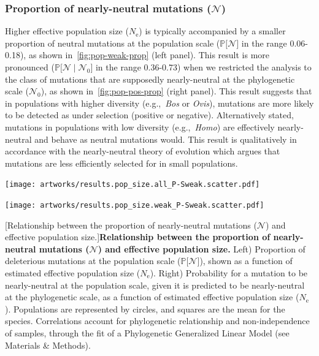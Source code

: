 \documentclass{article}
\newcommand{\Ne}{N_{\text{e}}}
\newcommand{\proba}{\mathbb{P}}
\newcommand{\SphyNeu}{\mathcal{N}_0}
\newcommand{\given}{\mid}
\newcommand{\SpopNeu}{\mathcal{N}}
\begin{document}
    \subsubsection{Proportion of nearly-neutral mutations (\texorpdfstring{$\SpopNeu$}{N})}\label{subsec:proportion-nearly-neutral-mutations}
    Higher effective population size ($\Ne$) is typically accompanied by a smaller proportion of neutral mutations at the population scale ($\proba{[} \SpopNeu {]}$ in the range 0.06-0.18), as shown in~\ref{fig:pop-weak-prop} (left panel).
    This result is more pronounced ($\proba{[} \SpopNeu \given \SphyNeu {]}$ in the range 0.36-0.73) when we restricted the analysis to the class of mutations that are supposedly nearly-neutral at the phylogenetic scale ($\SphyNeu$), as shown in~\ref{fig:pop-pos-prop} (right panel).
    This result suggests that in populations with higher diversity (e.g.,~\textit{Bos} or \textit{Ovis}), mutations are more likely to be detected as under selection (positive or negative).
    Alternatively stated, mutations in populations with low diversity (e.g.,~\textit{Homo}) are effectively nearly-neutral and behave as neutral mutations would.
    This result is qualitatively in accordance with the nearly-neutral theory of evolution which argues that mutations are less efficiently selected for in small populations.

    \begin{center}
        \begin{minipage}{0.45\linewidth}
            \texttt{[image: artworks/results.pop\_size.all\_P-Sweak.scatter.pdf]}
        \end{minipage}
        \begin{minipage}{0.45\linewidth}
            \texttt{[image: artworks/results.pop\_size.weak\_P-Sweak.scatter.pdf]}
        \end{minipage}
        [Relationship between the proportion of nearly-neutral mutations ($\SpopNeu$) and effective population size.]{\textbf{Relationship between the proportion of nearly-neutral mutations ($\bm{\SpopNeu}$) and effective population size.}
        Left) Proportion of deleterious mutations at the population scale ($\proba{[} \SpopNeu{]}$), shown as a function of estimated effective population size ($\Ne$). Right) Probability for a mutation to be nearly-neutral at the population scale, given it is predicted to be nearly-neutral at the phylogenetic scale, as a function of estimated effective population size ($\Ne$). Populations are represented by circles, and squares are the mean for the species. Correlations account for phylogenetic relationship and non-independence of samples, through the fit of a Phylogenetic Generalized Linear Model (see Materials \& Methods).\label{fig:pop-weak-prop}}
    \end{center}
\end{document}
